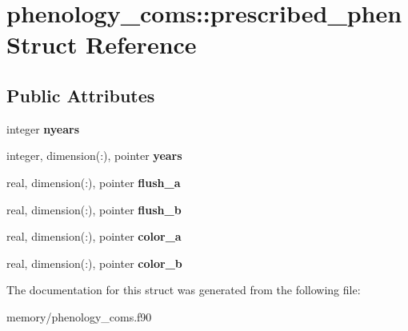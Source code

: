 \hypertarget{structphenology__coms_1_1prescribed__phen}{
\section{phenology\_\-coms::prescribed\_\-phen Struct Reference}
\label{structphenology__coms_1_1prescribed__phen}
}
\subsection*{Public Attributes}
\begin{DoxyCompactItemize}
\item 
\hypertarget{structphenology__coms_1_1prescribed__phen_ae504780a4760ecefc6851a141bbb426b}{
integer {\bfseries nyears}}
\label{structphenology__coms_1_1prescribed__phen_ae504780a4760ecefc6851a141bbb426b}

\item 
\hypertarget{structphenology__coms_1_1prescribed__phen_a1dcfb6c056c3d90b62d022340e8b8d13}{
integer, dimension(:), pointer {\bfseries years}}
\label{structphenology__coms_1_1prescribed__phen_a1dcfb6c056c3d90b62d022340e8b8d13}

\item 
\hypertarget{structphenology__coms_1_1prescribed__phen_afa83c9a69d9d4991d2b159bad3f60672}{
real, dimension(:), pointer {\bfseries flush\_\-a}}
\label{structphenology__coms_1_1prescribed__phen_afa83c9a69d9d4991d2b159bad3f60672}

\item 
\hypertarget{structphenology__coms_1_1prescribed__phen_a6196c1b146a1a3dca4b74e9672ce9961}{
real, dimension(:), pointer {\bfseries flush\_\-b}}
\label{structphenology__coms_1_1prescribed__phen_a6196c1b146a1a3dca4b74e9672ce9961}

\item 
\hypertarget{structphenology__coms_1_1prescribed__phen_a570dc5ec87db96509ebdb846fdb1f464}{
real, dimension(:), pointer {\bfseries color\_\-a}}
\label{structphenology__coms_1_1prescribed__phen_a570dc5ec87db96509ebdb846fdb1f464}

\item 
\hypertarget{structphenology__coms_1_1prescribed__phen_ae5ff69d8cc60c2c78298d975eaf8ba19}{
real, dimension(:), pointer {\bfseries color\_\-b}}
\label{structphenology__coms_1_1prescribed__phen_ae5ff69d8cc60c2c78298d975eaf8ba19}

\end{DoxyCompactItemize}


The documentation for this struct was generated from the following file:\begin{DoxyCompactItemize}
\item 
memory/phenology\_\-coms.f90\end{DoxyCompactItemize}
